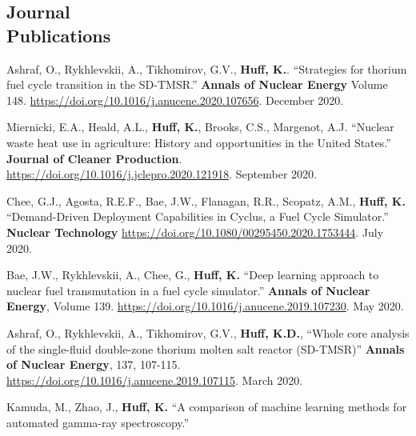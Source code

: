 \documentclass[margin,line]{resume}
\begin{document}
\begin{resume}
    \section{\mysidestyle Journal\\Publications}
      \begin{bibenum}
      \item Ashraf, O., Rykhlevskii, A., Tikhomirov, G.V., \textbf{Huff, K.}.
              ``Strategies for thorium fuel cycle transition in the SD-TMSR.''
              \textbf{Annals of Nuclear Energy} Volume 148.
              \url{https://doi.org/10.1016/j.anucene.2020.107656}. December
              2020.
      \item Miernicki, E.A., Heald, A.L., \textbf{Huff, K.}, Brooks, C.S.,
              Margenot, A.J. ``Nuclear waste heat use in agriculture: History
              and opportunities in the United States.'' \textbf{Journal of
              Cleaner Production}.
              \url{https://doi.org/10.1016/j.jclepro.2020.121918}. September
              2020.
      \item Chee, G.J., Agosta, R.E.F., Bae, J.W., Flanagan, R.R., Scopatz,
              A.M., \textbf{Huff, K.} ``Demand-Driven Deployment Capabilities
              in Cyclus, a Fuel Cycle Simulator.'' \textbf{Nuclear Technology}
              \url{https://doi.org/10.1080/00295450.2020.1753444}. July 2020.
      \item Bae, J.W., Rykhlevskii, A., Chee, G., \textbf{Huff, K.} ``Deep
              learning approach to nuclear fuel transmutation in a fuel cycle
              simulator.'' \textbf{Annals of Nuclear Energy}, Volume 139.
              \url{https://doi.org/10.1016/j.anucene.2019.107230}. May 2020.
      \item Ashraf, O., Rykhlevskii, A., Tikhomirov, G.V., \textbf{Huff,
              K.D.}, ``Whole core analysis of the single-fluid double-zone
              thorium molten salt reactor (SD-TMSR)'' \textbf{Annals of Nuclear
              Energy}, 137, 107-115.
              \url{https://doi.org/10.1016/j.anucene.2019.107115}. March 2020.
      \item Kamuda, M., Zhao, J., \textbf{Huff, K.} ``A comparison of machine
              learning methods for automated gamma-ray spectroscopy.''

\end{bibenum}
\end{resume}
\end{document}
